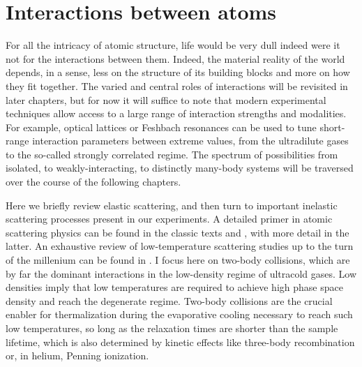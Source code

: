 	


	
\section{Interactions between atoms}

	For all the intricacy of atomic structure, life would be very dull indeed were it not for the interactions between them. Indeed, the material reality of the world depends, in a sense, less on the structure of its building blocks and more on how they fit together. The varied and central roles of interactions will be revisited in later chapters, but for now it will suffice to note that modern experimental techniques allow access to a large range of interaction strengths and modalities. For example, optical lattices or Feshbach resonances can be used to tune short-range interaction parameters between extreme values, from the ultradilute gases to the so-called strongly correlated regime. The spectrum of possibilities from isolated, to weakly-interacting, to distinctly many-body systems will be traversed over the course of the following chapters. 
	
	Here we briefly review elastic scattering, and then turn to important inelastic scattering processes present in our experiments. A detailed primer in atomic scattering physics can be found in the classic texts \cite{PitaevskiiStringari} and \cite{PethickSmith}, with more detail in the latter. An exhaustive review of low-temperature scattering studies up to the turn of the millenium can be found in \cite{weiner99}. I focus here on two-body collisions, which are by far the dominant interactions in the low-density regime of ultracold gases. Low densities imply that low temperatures are required to achieve high phase space density and reach the degenerate regime. Two-body collisions are the crucial enabler for thermalization during the evaporative cooling necessary to reach such low temperatures, so long as the relaxation times are shorter than the sample lifetime, which is also determined by kinetic effects like three-body recombination or, in helium, Penning ionization. 

